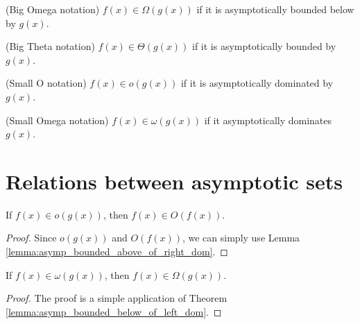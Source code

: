 \begin{definition}(Big Omega notation)
    \label{def:big_omega}
    \leanok
    $f(x) \in \Omega(g(x))$ if it is asymptotically bounded below by $g(x)$.
\end{definition}

\begin{definition}(Big Theta notation)
    \label{def:theta}
    \leanok
    $f(x) \in \Theta(g(x))$ if it is asymptotically bounded by $g(x)$. 
\end{definition}

\begin{definition}(Small O notation)
    \label{def:small_o}
    \leanok
    $f(x) \in o(g(x))$ if it is asymptotically dominated by $g(x)$.
\end{definition}

\begin{definition}(Small Omega notation)
    \label{def:small_omega}
    \leanok
    $f(x) \in \omega(g(x))$ if it asymptotically dominates $g(x)$.
\end{definition}


\section{Relations between asymptotic sets} 

\begin{lemma}
    \label{lemma:big_o_of_small_o}
    \leanok
    If $f(x) \in o(g(x))$, then $f(x) \in O(f(x))$.
\end{lemma}

\begin{proof}
    \leanok
    Since $o(g(x))$ and $O(f(x))$, we can simply use Lemma 
    \ref{lemma:asymp_bounded_above_of_right_dom}.
\end{proof}

\begin{theorem}
    \label{thm:big_omega_of_small_omega}
    \leanok
    If $f(x) \in \omega(g(x))$, then $f(x) \in \Omega(g(x))$.
\end{theorem}

\begin{proof}
    \leanok
    The proof is a simple application of Theorem 
    \ref{lemma:asymp_bounded_below_of_left_dom}.
\end{proof}

